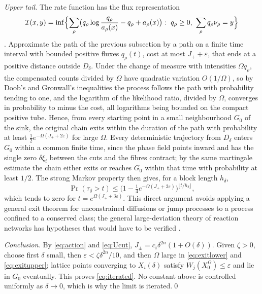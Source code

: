 \emph{Upper tail.} The rate function has the flux representation
\[
 \mathcal I(x,y)=\inf\Bigl\{\sum_\rho\bigl(q_\rho\log\frac{q_\rho}{a_\rho(x)}-q_\rho+a_\rho(x)\bigr):
 \ q_\rho\ge0,\ \sum_\rho q_\rho\nu_\rho=y\Bigr\}
\]
\cite{ShwartzWeiss1995}. Approximate the path of the previous subsection by a path on a finite
time interval with bounded positive fluxes \(q_\rho(t)\), cost at most \(J_++\varepsilon\), that
ends at a positive distance outside \(D_\delta\). Under the change of measure with intensities
\(\Omega q_\rho\), the compensated counts divided by \(\Omega\) have quadratic variation
\(O(1/\Omega)\), so by Doob's and Gronwall's inequalities the process follows the path with
probability tending to one, and the logarithm of the likelihood ratio, divided by \(\Omega\),
converges in probability to minus the cost, all logarithms being bounded on the compact
positive tube. Hence, from every starting point in a small neighbourhood \(G_0\) of the sink,
the original chain exits within the duration of the path with probability at least
\(\tfrac12e^{-\Omega(J_++2\varepsilon)}\) for large \(\Omega\). Every deterministic
trajectory from \(\overline{D_\delta}\) enters \(G_0\) within a common finite time, since the
phase field points inward and has the single zero \(\delta\xi_i\) between the cuts and the
fibres contract; by the same martingale estimate the chain either exits or reaches \(G_0\)
within that time with probability at least \(1/2\). The strong Markov property then gives, for
a block length \(h_\delta\),
\begin{equation}\label{eq:exitupper}
 \Pr(\tau_\delta>t)\le\bigl(1-\tfrac14e^{-\Omega(J_++2\varepsilon)}\bigr)^{\lfloor t/h_\delta\rfloor},
\end{equation}
which tends to zero for \(t=e^{\Omega(J_++3\varepsilon)}\). This direct argument avoids
applying a general exit theorem for unconstrained diffusions or jump processes to a process
confined to a conserved class; the general large-deviation theory of reaction networks has
hypotheses that would have to be verified \cite{AgazziDemboEckmann2018}.

\emph{Conclusion.} By \eqref{eq:action} and \eqref{eq:Ucut},
\(J_\pm=c_i\delta^{2n}(1+O(\delta))\). Given \(\zeta>0\), choose first \(\delta\) small, then
\(\varepsilon<\zeta\delta^{2n}/10\), and then \(\Omega\) large in \eqref{eq:exitlower} and
\eqref{eq:exitupper}; lattice points converging to \(X_i(\delta)\) satisfy
\(W_j(X_0^\Omega)\le\varepsilon\) and lie in \(G_0\) eventually. This proves
\eqref{eq:iterated}. No constant above is controlled uniformly as \(\delta\to0\), which is why
the limit is iterated.\qed

